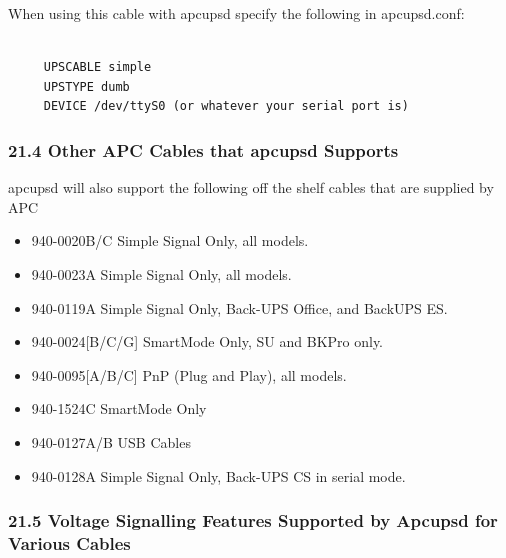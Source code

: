 {{{{{{{{{{\begin{verbatim}
\end{verbatim}
\normalsize

When using this cable with apcupsd specify the following in apcupsd.conf: 

\footnotesize
\begin{verbatim}
     
     UPSCABLE simple
     UPSTYPE dumb
     DEVICE /dev/ttyS0 (or whatever your serial port is)
\end{verbatim}
\normalsize

\label{Other-APC-Cables-that-apcupsd-Supports}

\subsubsection*{21.4 Other APC Cables that apcupsd Supports}

apcupsd will also support the following off the shelf cables that are supplied
by APC  

\begin{itemize}
\item 940-0020B/C Simple Signal Only, all models.  
\item 940-0023A Simple Signal Only, all models.  
\item 940-0119A Simple Signal Only, Back-UPS Office, and BackUPS ES.  
\item 940-0024[B/C/G] SmartMode Only, SU and BKPro only.  
\item 940-0095[A/B/C] PnP (Plug and Play), all models.  
\item 940-1524C SmartMode Only  
\item 940-0127A/B USB Cables  
\item 940-0128A Simple Signal Only, Back-UPS CS in serial mode. 
\end{itemize}

\label{Voltage-Signalling-Features-Supported-by-Apcupsd-for-Various-Cables}

\subsubsection*{21.5 Voltage Signalling Features Supported by Apcupsd for
Various Cables}

}}}}}}}}}}
